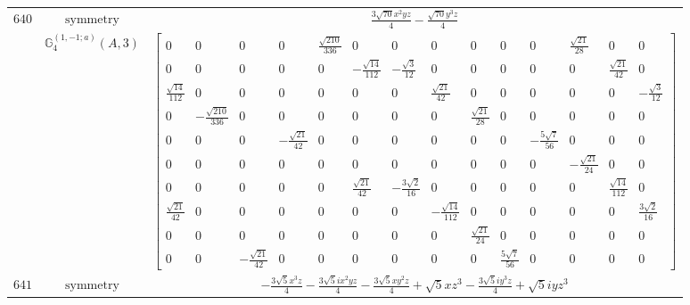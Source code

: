\documentclass[fleqn,8pt,landscape]{jsarticle}
\begin{document}
\begin{longtable}{ccc}
$ 640 $ & $ \text{symmetry} $ & $ \frac{3 \sqrt{70} x^{2} y z}{4} - \frac{\sqrt{70} y^{3} z}{4} $ \\
$  $ & $ \mathbb{G}_{4}^{(1,-1;a)}(A,3) $ & $ \begin{bmatrix} 0 & 0 & 0 & 0 & \frac{\sqrt{210}}{336} & 0 & 0 & 0 & 0 & 0 & 0 & \frac{\sqrt{21}}{28} & 0 & 0 \\ 0 & 0 & 0 & 0 & 0 & - \frac{\sqrt{14}}{112} & - \frac{\sqrt{3}}{12} & 0 & 0 & 0 & 0 & 0 & \frac{\sqrt{21}}{42} & 0 \\ \frac{\sqrt{14}}{112} & 0 & 0 & 0 & 0 & 0 & 0 & \frac{\sqrt{21}}{42} & 0 & 0 & 0 & 0 & 0 & - \frac{\sqrt{3}}{12} \\ 0 & - \frac{\sqrt{210}}{336} & 0 & 0 & 0 & 0 & 0 & 0 & \frac{\sqrt{21}}{28} & 0 & 0 & 0 & 0 & 0 \\ 0 & 0 & 0 & - \frac{\sqrt{21}}{42} & 0 & 0 & 0 & 0 & 0 & 0 & - \frac{5 \sqrt{7}}{56} & 0 & 0 & 0 \\ 0 & 0 & 0 & 0 & 0 & 0 & 0 & 0 & 0 & 0 & 0 & - \frac{\sqrt{21}}{24} & 0 & 0 \\ 0 & 0 & 0 & 0 & 0 & \frac{\sqrt{21}}{42} & - \frac{3 \sqrt{2}}{16} & 0 & 0 & 0 & 0 & 0 & \frac{\sqrt{14}}{112} & 0 \\ \frac{\sqrt{21}}{42} & 0 & 0 & 0 & 0 & 0 & 0 & - \frac{\sqrt{14}}{112} & 0 & 0 & 0 & 0 & 0 & \frac{3 \sqrt{2}}{16} \\ 0 & 0 & 0 & 0 & 0 & 0 & 0 & 0 & \frac{\sqrt{21}}{24} & 0 & 0 & 0 & 0 & 0 \\ 0 & 0 & - \frac{\sqrt{21}}{42} & 0 & 0 & 0 & 0 & 0 & 0 & \frac{5 \sqrt{7}}{56} & 0 & 0 & 0 & 0 \end{bmatrix} $ \\ \hline
$ 641 $ & $ \text{symmetry} $ & $ - \frac{3 \sqrt{5} x^{3} z}{4} - \frac{3 \sqrt{5} i x^{2} y z}{4} - \frac{3 \sqrt{5} x y^{2} z}{4} + \sqrt{5} x z^{3} - \frac{3 \sqrt{5} i y^{3} z}{4} + \sqrt{5} i y z^{3} $ \\

\end{longtable}
\end{document}
